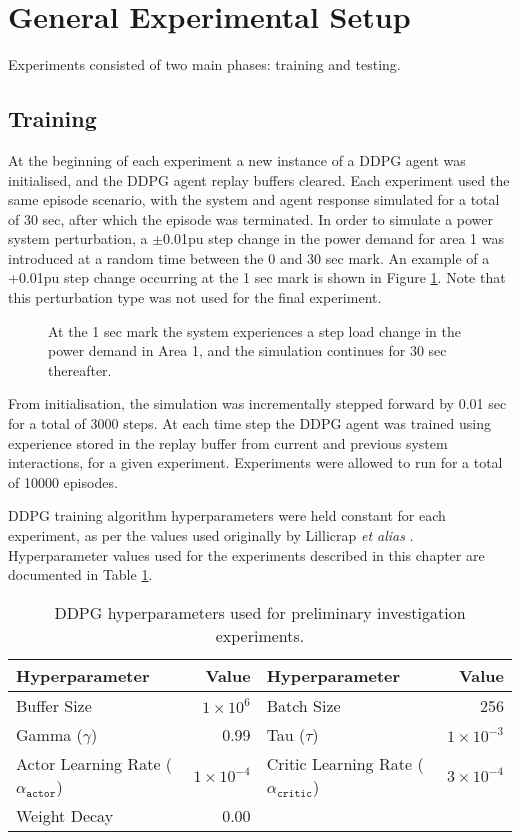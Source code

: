 \section{General Experimental Setup}

Experiments consisted of two main phases: training and testing.

\subsection{Training}
At the beginning of each experiment a new instance of a DDPG agent was initialised, and the DDPG agent replay buffers cleared. Each experiment used the same episode scenario, with the system and agent response simulated for a total of 30 sec, after which the episode was terminated. In order to simulate a power system perturbation, a $\pm$0.01pu step change in the power demand for area 1 was introduced at a random time between the 0 and 30 sec mark. An example of a +0.01pu step change occurring at the 1 sec mark is shown in Figure \ref{fig:5001_demand_profile}. Note that this perturbation type was not used for the final experiment.

\begin{figure}[h]
	\centering
	
	\caption[Preliminary investigation load demand step change]{At the 1 sec mark the system experiences a step load change in the power demand in Area 1, and the simulation continues for 30 sec thereafter.}
	\label{fig:5001_demand_profile}
\end{figure}

From initialisation, the simulation was incrementally stepped forward by 0.01 sec for a total of 3000 steps. At each time step the DDPG agent was trained using experience stored in the replay buffer from current and previous system interactions, for a given experiment. Experiments were allowed to run for a total of 10000 episodes.

DDPG training algorithm hyperparameters were held constant for each experiment, as per the values used originally by Lillicrap \textit{et alias} \cite{Lillicrap2015}. Hyperparameter values used for the experiments described in this chapter are documented in Table \ref{tab:5000_hyperparameters}.

\begin{table}[h]
	\centering
	\caption{DDPG hyperparameters used for preliminary investigation experiments.}
	\begin{tabular}{lrlr}
	\toprule
	\textbf{Hyperparameter} & \textbf{Value} & \textbf{Hyperparameter} & \textbf{Value} \\
	\midrule
	Buffer Size 	 & $1 \times 10^6$  & Batch Size 	& 256 \\
	Gamma ($\gamma$) & 0.99 	& Tau ($\tau$) 	& $1 \times 10^{-3}$ \\
	Actor Learning Rate ($\alpha_{\texttt{actor}}$) & $1 \times 10^{-4}$ & Critic Learning Rate ($\alpha_{\texttt{critic}}$) & $3 \times 10^{-4} $ \\
	Weight Decay & 0.00 & & \\
	\bottomrule
	\end{tabular}\label{tab:5000_hyperparameters}
\end{table}

